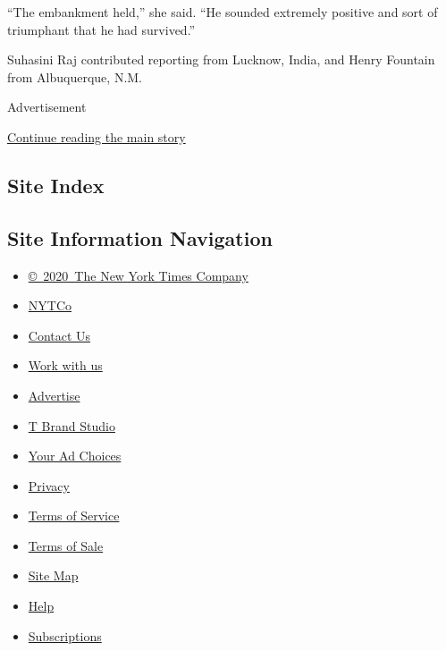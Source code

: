 ``The embankment held,'' she said. ``He sounded extremely positive and
sort of triumphant that he had survived.''

Suhasini Raj contributed reporting from Lucknow, India, and Henry
Fountain from Albuquerque, N.M.

Advertisement

\protect\hyperlink{after-bottom}{Continue reading the main story}

\hypertarget{site-index}{%
\subsection{Site Index}\label{site-index}}

\hypertarget{site-information-navigation}{%
\subsection{Site Information
Navigation}\label{site-information-navigation}}

\begin{itemize}
\tightlist
\item
  \href{https://help.nytimes3xbfgragh.onion/hc/en-us/articles/115014792127-Copyright-notice}{©~2020~The
  New York Times Company}
\end{itemize}

\begin{itemize}
\tightlist
\item
  \href{https://www.nytco.com/}{NYTCo}
\item
  \href{https://help.nytimes3xbfgragh.onion/hc/en-us/articles/115015385887-Contact-Us}{Contact
  Us}
\item
  \href{https://www.nytco.com/careers/}{Work with us}
\item
  \href{https://nytmediakit.com/}{Advertise}
\item
  \href{http://www.tbrandstudio.com/}{T Brand Studio}
\item
  \href{https://www.nytimes3xbfgragh.onion/privacy/cookie-policy\#how-do-i-manage-trackers}{Your
  Ad Choices}
\item
  \href{https://www.nytimes3xbfgragh.onion/privacy}{Privacy}
\item
  \href{https://help.nytimes3xbfgragh.onion/hc/en-us/articles/115014893428-Terms-of-service}{Terms
  of Service}
\item
  \href{https://help.nytimes3xbfgragh.onion/hc/en-us/articles/115014893968-Terms-of-sale}{Terms
  of Sale}
\item
  \href{https://spiderbites.nytimes3xbfgragh.onion}{Site Map}
\item
  \href{https://help.nytimes3xbfgragh.onion/hc/en-us}{Help}
\item
  \href{https://www.nytimes3xbfgragh.onion/subscription?campaignId=37WXW}{Subscriptions}
\end{itemize}
